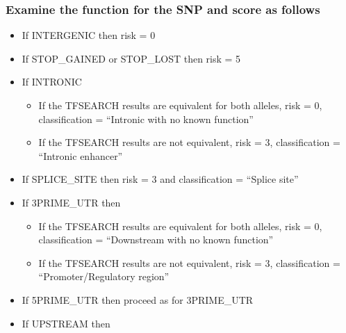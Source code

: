 \documentclass[11pt]{article}
\begin{document}
\subsubsection{Examine the function for the SNP and score as follows}
\label{sec-4-4-2}
\begin{itemize}

\item If INTERGENIC then risk = 0\\
\label{sec-4-4-2-1}%
\item If STOP\_GAINED or STOP\_LOST then risk = 5\\
\label{sec-4-4-2-2}%
\item If INTRONIC\\
\label{sec-4-4-2-3}%
\begin{itemize}

\item If the TFSEARCH results are equivalent for both alleles, risk = 0, classification = ``Intronic with no known function''\\
\label{sec-4-4-2-3-1}%
\item If the TFSEARCH results are not equivalent, risk = 3, classification = ``Intronic enhancer''\\
\label{sec-4-4-2-3-2}%
\end{itemize} %

\item If SPLICE\_SITE then risk = 3 and classification = ``Splice site''\\
\label{sec-4-4-2-4}%
\item If 3PRIME\_UTR then\\
\label{sec-4-4-2-5}%
\begin{itemize}

\item If the TFSEARCH results are equivalent for both alleles, risk = 0, classification = ``Downstream with no known function''\\
\label{sec-4-4-2-5-1}%
\item If the TFSEARCH results are not equivalent, risk = 3, classification = ``Promoter/Regulatory region''\\
\label{sec-4-4-2-5-2}%
\end{itemize} %

\item If 5PRIME\_UTR then proceed as for 3PRIME\_UTR\\
\label{sec-4-4-2-6}%
\item If UPSTREAM then\\
\label{sec-4-4-2-7}%
\begin{itemize}


\end{itemize}
\end{itemize}
\end{document}
